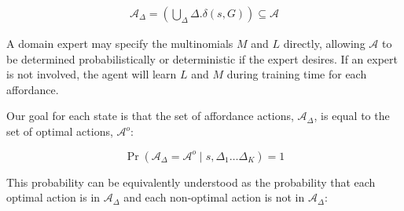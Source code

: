 \documentclass[conference]{IEEEtran}
\newcommand{\dnote}[1]{\textcolor{Green}{\textbf{D: #1}}}
\newcommand{\enote}[1]{\textcolor{Red}{\textbf{E: #1}}}
\begin{document}
\begin{align}
\mathcal{A}_{\Delta} = \left(\bigcup\limits_{\Delta} \Delta.\delta(s,G) \right) \subseteq \mathcal{A}
\label{eq:afford_union}
\end{align}


A domain expert may specify the multinomials $M$ and $L$ directly, allowing $\mathcal{A}$ to be determined probabilistically or deterministic if the expert desires.
If an expert is not involved, the agent will learn $L$ and $M$ during training time for each affordance. 

Our goal for each state is that the set of affordance actions, $\mathcal{A}_{\Delta}$, is equal to the set of optimal actions, $\mathcal{A}^o$:

\begin{equation} 
\Pr( \mathcal{A}_{\Delta} = \mathcal{A}^o \mid s, \Delta_1 \dots \Delta_K) = 1
\label{eq:opt}
\end{equation}


This probability can be equivalently understood as the probability that each optimal action is in $\mathcal{A}_{\Delta}$ and each non-optimal action is not in $\mathcal{A}_{\Delta}$: %
\end{document}
